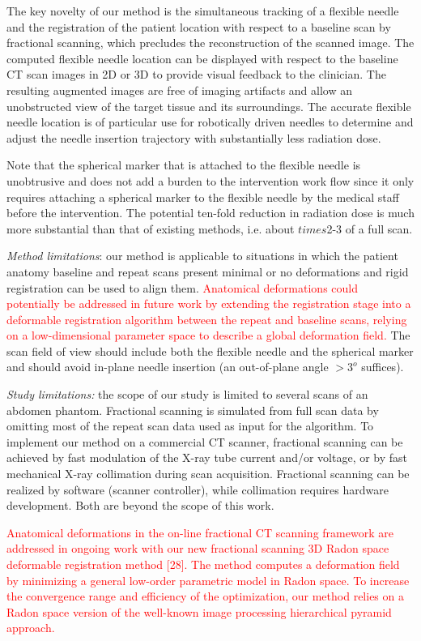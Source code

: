 The key novelty of our method is the simultaneous tracking of a flexible needle and the registration of the patient location with respect to a baseline scan by fractional scanning, which precludes the reconstruction of the scanned image. The computed flexible needle location can be displayed with respect to the baseline CT scan images in 2D or 3D to provide visual feedback to the clinician. The resulting augmented images are free of imaging artifacts and allow an unobstructed view of the target tissue and its surroundings. The accurate flexible needle location is of particular use for robotically driven needles to determine and adjust the needle insertion trajectory with substantially less radiation dose. 

Note that the spherical marker that is attached to the flexible needle is unobtrusive and does not add a burden to the intervention work flow since it only requires attaching a spherical marker to the flexible needle by the medical staff before the intervention. The potential ten-fold reduction in radiation dose is much more substantial than that of existing methods, i.e. about $times$2-3 of a full scan. 

{\em Method limitations}: our method is applicable to situations in which the patient anatomy baseline and repeat scans present minimal or no deformations and rigid registration can be used to align them. 
\textcolor{red}{Anatomical deformations could potentially be addressed in future work by extending the registration stage into a deformable registration algorithm between the repeat and baseline scans, relying on a low-dimensional parameter space to describe a global deformation field.}
The scan field of view should include both the flexible needle and the spherical marker and should avoid in-plane needle insertion (an out-of-plane angle $>3^o$ suffices).

{\em Study limitations:} the scope of our study is limited to several scans of an abdomen phantom. Fractional scanning is simulated from full scan data by omitting most of the repeat scan data used as input for the algorithm. To implement our method on a commercial CT scanner, fractional scanning can be achieved by fast modulation of the X-ray tube current and/or voltage, or by fast mechanical X-ray  collimation during scan acquisition. Fractional scanning can be realized by software (scanner controller), while collimation requires hardware development. Both are beyond the scope of this work.
 
\textcolor{red}{Anatomical deformations in the on-line fractional CT scanning framework are addressed in ongoing work with our new fractional scanning 3D Radon space deformable registration method [28]. The method computes a deformation field by minimizing a general low-order parametric model in Radon space.  To increase the convergence range and efficiency of the optimization, our method relies on a Radon space version of the well-known image processing hierarchical pyramid approach.}
 

